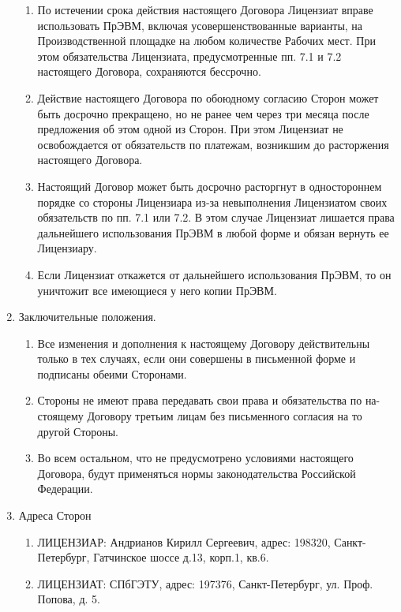 \begin{enumerate}
\begin{enumerate}
        \item По истечении срока действия настоящего Договора Лицензиат вправе использовать ПрЭВМ, включая усовершенствованные варианты, на Производственной площадке на любом количестве Рабочих мест. При этом обязательства Лицензиата, предусмотренные пп. 7.1 и 7.2 настоящего Договора, сохраняются бессрочно.
        \item Действие настоящего Договора по обоюдному согласию Сторон может быть досрочно прекращено, но не ранее чем через три месяца после предложения об этом одной из Сторон. При этом Лицензиат не освобождается от обязательств по платежам, возникшим до расторжения настоящего Договора.
        \item Настоящий Договор может быть досрочно расторгнут в одностороннем порядке со стороны Лицензиара из-за невыполнения Лицензиатом своих обязательств по пп. 7.1 или 7.2. В этом случае Лицензиат лишается права дальнейшего использования ПрЭВМ в любой форме и обязан вернуть ее Лицензиару.
        \item Если Лицензиат откажется от дальнейшего использования ПрЭВМ, то он уничтожит все имеющиеся у него копии ПрЭВМ.
    \end{enumerate}
    \item Заключительные положения.
    \begin{enumerate}
        \item Все изменения и дополнения к настоящему Договору действительны только в тех случаях, если они совершены в письменной форме и подписаны обеими Сторонами.
        \item Стороны не имеют права передавать свои права и обязательства по на-стоящему Договору третьим лицам без письменного согласия на то другой Стороны.
        \item Во всем остальном, что не предусмотрено условиями настоящего Договора, будут применяться нормы законодательства Российской Федерации.
    \end{enumerate}
    \item Адреса Сторон
    \begin{enumerate}
        \item ЛИЦЕНЗИАР: Андрианов Кирилл   Сергеевич, адрес: 198320, Санкт-Петербург, Гатчинское шоссе д.13,  корп.1, кв.6.
        \item ЛИЦЕНЗИАТ: СПбГЭТУ, адрес: 197376, Санкт-Петербург, ул. Проф. Попова, д. 5.
    \end{enumerate}
\end{enumerate}

